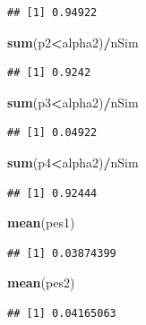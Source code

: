 \documentclass[]{article}
\newenvironment{Shaded}{\begin{snugshade}}{\end{snugshade}}
\newcommand{\KeywordTok}[1]{\textcolor[rgb]{0.13,0.29,0.53}{\textbf{#1}}}
\newcommand{\OperatorTok}[1]{\textcolor[rgb]{0.81,0.36,0.00}{\textbf{#1}}}
\newcommand{\NormalTok}[1]{#1}
\begin{document}
\begin{verbatim}
## [1] 0.94922
\end{verbatim}

\begin{Shaded}
\begin{Highlighting}[]
\KeywordTok{sum}\NormalTok{(p2}\OperatorTok{<}\NormalTok{alpha2)}\OperatorTok{/}\NormalTok{nSim}
\end{Highlighting}
\end{Shaded}

\begin{verbatim}
## [1] 0.9242
\end{verbatim}

\begin{Shaded}
\begin{Highlighting}[]
\KeywordTok{sum}\NormalTok{(p3}\OperatorTok{<}\NormalTok{alpha2)}\OperatorTok{/}\NormalTok{nSim}
\end{Highlighting}
\end{Shaded}

\begin{verbatim}
## [1] 0.04922
\end{verbatim}

\begin{Shaded}
\begin{Highlighting}[]
\KeywordTok{sum}\NormalTok{(p4}\OperatorTok{<}\NormalTok{alpha2)}\OperatorTok{/}\NormalTok{nSim}
\end{Highlighting}
\end{Shaded}

\begin{verbatim}
## [1] 0.92444
\end{verbatim}

\begin{Shaded}
\begin{Highlighting}[]
\KeywordTok{mean}\NormalTok{(pes1)}
\end{Highlighting}
\end{Shaded}

\begin{verbatim}
## [1] 0.03874399
\end{verbatim}

\begin{Shaded}
\begin{Highlighting}[]
\KeywordTok{mean}\NormalTok{(pes2)}
\end{Highlighting}
\end{Shaded}

\begin{verbatim}
## [1] 0.04165063
\end{verbatim}
\end{document}
